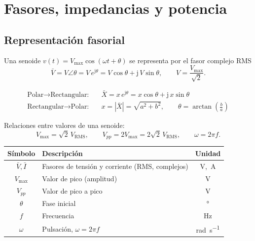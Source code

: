 \documentclass[11pt,a4paper]{article}
\newcommand{\ju}{\mathrm{j}}
\begin{document}
\section{Fasores, impedancias y potencia}

\subsection{Representación fasorial}

Una senoide $v(t) = V_{\max}\cos(\omega t + \theta)$ se representa por el fasor complejo RMS
\[
  \bar{V} = V \angle \theta = V\,e^{\ju\theta} = V\cos\theta + \ju\,V\sin\theta,
  \qquad V = \frac{V_{\max}}{\sqrt{2}}.
\]

\begin{align}
  \text{Polar} \to \text{Rectangular:}&\quad \bar{X} = x\,e^{\ju\theta} = x\cos\theta + \ju\,x\sin\theta \\
  \text{Rectangular} \to \text{Polar:}&\quad x = |\bar{X}| = \sqrt{a^2+b^2}, \qquad
                                             \theta = \arctan\!\left(\frac{b}{a}\right)
\end{align}

Relaciones entre valores de una senoide:
\[
  V_{\max} = \sqrt{2}\,V_{\text{RMS}}, \qquad
  V_{pp} = 2V_{\max} = 2\sqrt{2}\,V_{\text{RMS}}, \qquad
  \omega = 2\pi f .
\]

\begin{table}[h]
\centering
\begin{tabular}{@{}cL{7.6cm}c@{}}
\toprule
\textbf{Símbolo} & \textbf{Descripción} & \textbf{Unidad} \\
\midrule
$\bar{V},\bar{I}$ & Fasores de tensión y corriente (RMS, complejos) & \unit{\volt},\ \unit{\ampere} \\
$V_{\max}$        & Valor de pico (amplitud) & \unit{\volt} \\
$V_{pp}$          & Valor de pico a pico & \unit{\volt} \\
$\theta$          & Fase inicial & \unit{\degree} \\
$f$               & Frecuencia & \unit{\hertz} \\
$\omega$          & Pulsación, $\omega = 2\pi f$ & \unit{\radian\per\second} \\
\bottomrule
\end{tabular}
\end{table}
\end{document}
